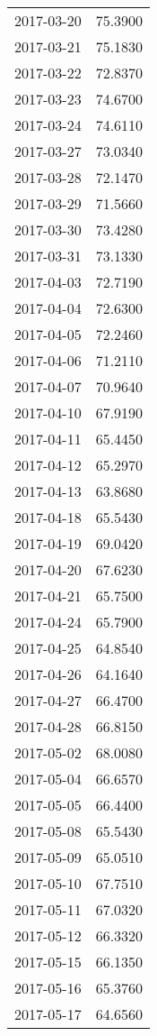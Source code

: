 \begin{tabular}{lr}
2017-03-20 &     75.3900 \\
2017-03-21 &     75.1830 \\
2017-03-22 &     72.8370 \\
2017-03-23 &     74.6700 \\
2017-03-24 &     74.6110 \\
2017-03-27 &     73.0340 \\
2017-03-28 &     72.1470 \\
2017-03-29 &     71.5660 \\
2017-03-30 &     73.4280 \\
2017-03-31 &     73.1330 \\
2017-04-03 &     72.7190 \\
2017-04-04 &     72.6300 \\
2017-04-05 &     72.2460 \\
2017-04-06 &     71.2110 \\
2017-04-07 &     70.9640 \\
2017-04-10 &     67.9190 \\
2017-04-11 &     65.4450 \\
2017-04-12 &     65.2970 \\
2017-04-13 &     63.8680 \\
2017-04-18 &     65.5430 \\
2017-04-19 &     69.0420 \\
2017-04-20 &     67.6230 \\
2017-04-21 &     65.7500 \\
2017-04-24 &     65.7900 \\
2017-04-25 &     64.8540 \\
2017-04-26 &     64.1640 \\
2017-04-27 &     66.4700 \\
2017-04-28 &     66.8150 \\
2017-05-02 &     68.0080 \\
2017-05-04 &     66.6570 \\
2017-05-05 &     66.4400 \\
2017-05-08 &     65.5430 \\
2017-05-09 &     65.0510 \\
2017-05-10 &     67.7510 \\
2017-05-11 &     67.0320 \\
2017-05-12 &     66.3320 \\
2017-05-15 &     66.1350 \\
2017-05-16 &     65.3760 \\
2017-05-17 &     64.6560 \\

\end{tabular}
